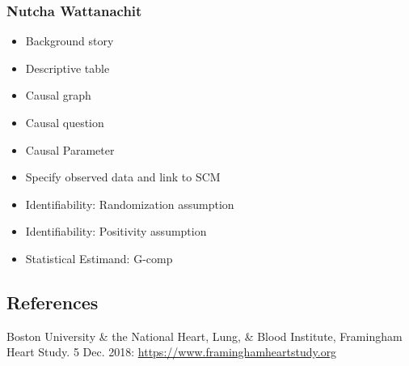 \documentclass[]{article}
\begin{document}
\subsubsection{Nutcha Wattanachit}\label{nutcha-wattanachit}

\begin{itemize}
\item  Background story 
\item  Descriptive table
\item  Causal graph
\item  Causal question
\item  Causal Parameter
\item  Specify observed data and link to SCM
\item  Identifiability: Randomization assumption
\item  Identifiability: Positivity assumption
\item  Statistical Estimand: G-comp

\end{itemize}

\subsection{References}\label{references}

Boston University \& the National Heart, Lung, \& Blood Institute,
Framingham Heart Study. 5 Dec. 2018:
\url{https://www.framinghamheartstudy.org}
\end{document}
